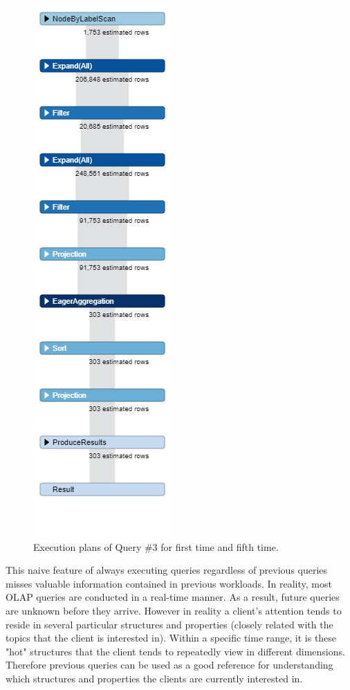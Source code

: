 \begin {figure}[H]
\includegraphics[scale=0.4]{pic/5.png}
\caption{Execution plans of Query \#3 for first time and fifth time.}

\end{figure}

This naive feature of always executing queries regardless of previous queries misses valuable information contained in previous workloads. In reality, most OLAP queries are conducted in a real-time manner. As a result, future queries are unknown before they arrive. However in reality a client’s attention tends to reside in several particular structures and properties (closely related with the topics that the client is interested in). Within a specific time range, it is these "hot" structures that the client tends to repeatedly view in different dimensions. Therefore previous queries can be used as a good reference for understanding which structures and properties the clients are currently interested in. 
 
